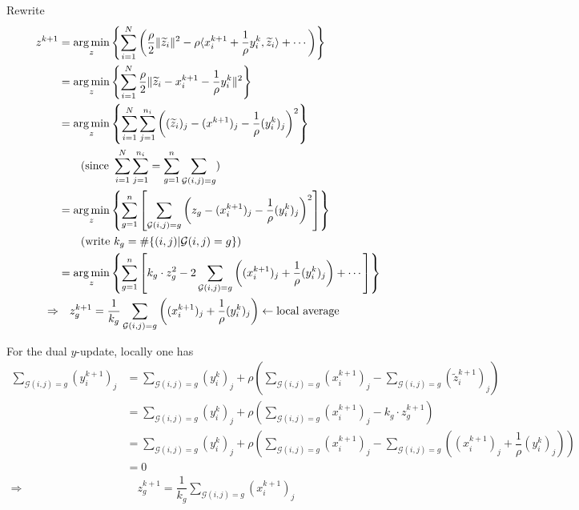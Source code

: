 Rewrite
\begin{align*}
    z^{k+1} & = \operatorname*{arg\,min}_{z} \left\{ \sum\limits_{i=1}^N \left( \dfrac{\rho}{2} \lVert \widetilde{z}_i \rVert^2 - \rho \langle x_i^{k+1} + \dfrac{1}{\rho} y_i^k, \widetilde{z}_i \rangle + \cdots \right) \right\} \\
    & = \operatorname*{arg\,min}_{z} \left\{ \sum\limits_{i=1}^N \dfrac{\rho}{2} \lVert \widetilde{z}_i - x_i^{k+1} -\dfrac{1}{\rho}y_i^k \rVert^2 \right\} \\
    & = \operatorname*{arg\,min}_{z} \left\{ \sum\limits_{i=1}^N \sum\limits_{j=1}^{n_i} \left( (\widetilde{z}_i)_j - (x^{k+1})_j - \dfrac{1}{\rho} (y_i^k)_j \right)^2 \right\} \\
    & \qquad ( \text{since } \sum\limits_{i=1}^N \sum\limits_{j=1}^{n_i} = \sum\limits_{g=1}^n \sum\limits_{\mathcal{G}(i,j)=g} ) \\
    & = \operatorname*{arg\,min}_{z} \left\{ \sum\limits_{g=1}^n \left[ \sum\limits_{\mathcal{G}(i,j)=g} \left( z_g - (x_i^{k+1})_j - \dfrac{1}{\rho} (y_i^k)_j \right)^2 \right] \right\} \\
    & \qquad ( \text{write } k_g = \# \{ (i,j) | \mathcal{G}(i,j) = g \} ) \\
    & = \operatorname*{arg\,min}_z \left\{ \sum\limits_{g=1}^n \left[ k_g\cdot z_g^2 - 2 \sum\limits_{\mathcal{G}(i,j)=g} \left( (x_i^{k+1})_j + \dfrac{1}{\rho} (y_i^k)_j \right) + \cdots \right] \right\} \\
    \Rightarrow & \quad z_g^{k+1} = \dfrac{1}{k_g} \sum\limits_{\mathcal{G}(i,j)=g} \left( (x_i^{k+1})_j + \dfrac{1}{\rho} (y_i^k)_j \right) \leftarrow \text{local average}
\end{align*}

For the dual $y$-update, locally one has
\begin{align*}
    \sum\limits_{\mathcal{G}(i,j)=g} (y_i^{k+1})_j & = \sum\limits_{\mathcal{G}(i,j)=g} (y_i^k)_j + \rho \left( \sum\limits_{\mathcal{G}(i,j)=g} (x_i^{k+1})_j - \sum\limits_{\mathcal{G}(i,j)=g} (\widetilde{z}_i^{k+1})_j \right) \\
    & = \sum\limits_{\mathcal{G}(i,j)=g} (y_i^k)_j + \rho \left( \sum\limits_{\mathcal{G}(i,j)=g} (x_i^{k+1})_j - k_g\cdot z_g^{k+1} \right) \\
    & = \sum\limits_{\mathcal{G}(i,j)=g} (y_i^k)_j + \rho \left( \sum\limits_{\mathcal{G}(i,j)=g} (x_i^{k+1})_j - \sum\limits_{\mathcal{G}(i,j)=g} \left( (x_i^{k+1})_j + \dfrac{1}{\rho} (y_i^k)_j \right) \right) \\
    & = 0 \\
    \Rightarrow & \quad z_g^{k+1} = \dfrac{1}{k_g} \sum\limits_{\mathcal{G}(i,j)=g} (x_i^{k+1})_j
\end{align*}

